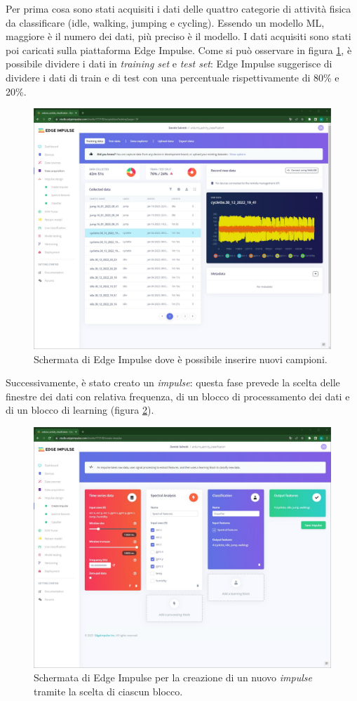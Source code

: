 Per prima cosa sono stati acquisiti i dati delle quattro categorie di attività fisica da classificare (idle, walking, jumping e cycling). Essendo un modello ML, maggiore è il numero dei dati, più preciso è il modello. I dati acquisiti sono stati poi caricati sulla piattaforma Edge Impulse. Come si può osservare in figura \ref{fig:acquisizione_dati}, è possibile dividere i dati in \textit{training set} e \textit{test set}: Edge Impulse suggerisce di dividere i dati di train e di test con una percentuale rispettivamente di 80\% e 20\%.
\begin{figure}[h!]
	\centering
	\includegraphics[width=0.5\linewidth]{./ImageFiles/data_acquisition.jpg}
	\caption{Schermata di Edge Impulse dove è possibile inserire nuovi campioni.}
	\label{fig:acquisizione_dati}
\end{figure}

Successivamente, è stato creato un \textit{impulse}: questa fase prevede la scelta delle finestre dei dati con relativa frequenza, di un blocco di processamento dei dati e di un blocco di learning (figura \ref{fig:creazione_impulse}).
\begin{figure}[h!]
	\centering
	\includegraphics[width=0.5\linewidth]{./ImageFiles/creazione_impulse.jpg}
	\caption{Schermata di Edge Impulse per la creazione di un nuovo \textit{impulse} tramite la scelta di ciascun blocco.}
	\label{fig:creazione_impulse}
\end{figure}

